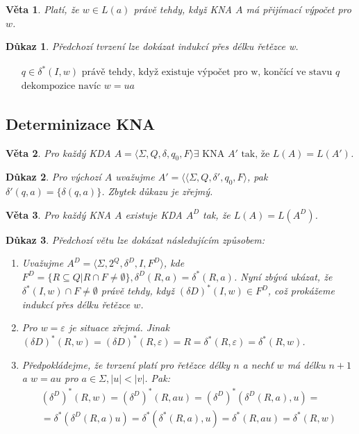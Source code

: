 \documentclass[10pt, a4paper, titlepage]{article}
\theoremstyle{note}
\newtheorem{veta}{Věta}
\newtheorem{dukaz}{Důkaz}
\begin{document}
\begin{veta}
Platí, že $w \in L(a)$ právě tehdy, když KNA $A$ má přijímací výpočet pro $w$.
\end{veta}
\begin{dukaz}
Předchozí tvrzení lze dokázat indukcí přes délku řetězce w.

\begin{gather*}
q \in \delta^{*}(I,w) \text{ právě tehdy, když existuje výpočet pro w, končící ve stavu } q \\
\text{dekompozice navíc } w = ua
\end{gather*}
\end{dukaz}

\subsection{Determinizace KNA}
\begin{veta}
Pro každý KDA $A=\langle \Sigma, Q, \delta, q_{0}, F \rangle \exists \text{ KNA } A' \text{ tak, že } L(A)=L(A') $.
\end{veta}
\begin{dukaz}
Pro výchozí $A$ uvažujme $A'=\langle \langle \Sigma, Q, \delta', q_{0}, F \rangle$, pak $\delta'(q,a) = \lbrace \delta(q,a) \rbrace$. Zbytek důkazu je zřejmý.
\end{dukaz}

\begin{veta}
Pro každý KNA $A$ existuje KDA $A^{D}$ tak, že $L(A) = L(A^{D})$.
\end{veta}
\begin{dukaz}
Předchozí větu lze dokázat následujícím způsobem:

\begin{enumerate}
\item
Uvažujme $A^{D} = \langle \Sigma, 2^{Q}, \delta^{D}, I, F^{D} \rangle$, kde $F^{D} = \lbrace R  \subseteq Q | R \cap F \neq \emptyset \rbrace, \delta^{D}(R,a) = \delta^{*}(R,a)$.
Nyní zbývá ukázat, že $\delta^{*}(I,w) \cap F \neq \emptyset$ právě tehdy, když $(\delta{D})^{*}(I,w) \in F^{D}$, což prokážeme indukcí přes délku řetězce $w$.

\item
Pro $w = \varepsilon$ je situace zřejmá. Jinak $(\delta{D})^{*} (R,w) = (\delta{D})^{*} (R, \varepsilon) = R = \delta^{*}(R, \varepsilon) = \delta^{*}(R,w)$.

\item
Předpokládejme, že tvrzení platí pro řetězce délky $n$ a nechť $w$ má délku $n+1$ a $w=au$ pro $a \in \Sigma, |u| < |v|$. Pak:
\begin{gather*}
(\delta^{D})^{*} (R,w) = (\delta^{D})^{*} (R, au) = (\delta^{D})^{*}(\delta^{D}(R,a),u) = \\
= \delta^{*}(\delta^{D}(R,a)u) = \delta^{*}(\delta^{*}(R,a),u) = \delta^{*}(R, au) = \delta^{*}(R,w)
\end{gather*}
\end{enumerate}
\end{dukaz}
\end{document}
